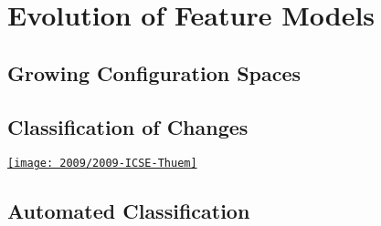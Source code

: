 




\author{Thomas Thüm, Elias Kuiter, Timo Kehrer}

\section{Evolution of Feature Models}
\subsection{Growing Configuration Spaces}
\subsection{Classification of Changes}
\begin{frame}{\insertsubsection}
	\begin{mycolumns}
		\href{https://github.com/SoftVarE-Group/Papers/blob/main/2009/2009-ICSE-Thuem.pdf}{\texttt{[image: 2009/2009-ICSE-Thuem]}}
	\mynextcolumn
	\end{mycolumns}
\end{frame}
\subsection{Automated Classification}

